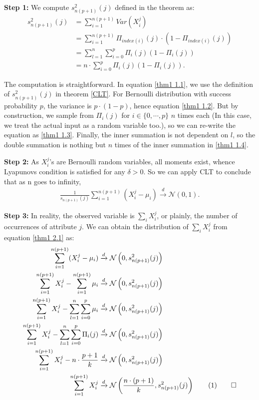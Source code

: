 \documentclass[10pt]{book}
\newcommand\numberthis{\addtocounter{equation}{1}\tag{\theequation}}
\begin{document}
\textbf{Step 1:} We compute $s_{n(p+1)}^2(j)$ defined in the theorem as:
\begin{align}
	s_{n(p+1)}^2(j) & = \sum_{i=1}^{n(p+1)} Var(X_i^j) \label{thm1 1.1} \\
		 		 	& = \sum_{i=1}^{n(p+1)} \Pi_{index(i)}(j) \cdot (1 - \Pi_{index(i)}(j)) \label{thm1 1.2} \\
		  		 	& = \sum_{l = 1}^{n} \sum_{i = 0}^{p} \Pi_i(j) (1 - \Pi_i(j))  \label{thm1 1.3}\\
		  		 	& = n \cdot \sum_{i = 0}^{p} \Pi_i(j) (1 - \Pi_i(j)) \label{thm1 1.4}.
\end{align}


The computation is straightforward. In equation \ref{thm1 1.1}, we use the definition of $s_{n(p+1)}^2(j)$ in theorem \ref{CLT}. For Bernoulli distribution with success probability $p$, the variance is $p \cdot (1 - p)$, hence equation \ref{thm1 1.2}. But by construction, we sample from $\Pi_i(j)$ for $i \in \{0, \cdots, p\}$ $n$ times each (In this case, we treat the actual input as a random variable too.), so we can re-write the equation as \ref{thm1 1.3}. Finally, the inner summation is not dependent on $l$, so the double summation is nothing but $n$ times of the inner summation in \ref{thm1 1.4}.


\textbf{Step 2:} As $X_i^j$'s are Bernoulli random variables, all moments exist, whence Lyapunovs condition is satisfied for any $\delta > 0$. So we can apply CLT to conclude that as n goes to infinity,
\begin{align}
	\frac{1}{s_{n(p+1)}(j)} \sum_{i=1}^{n(p+1)} (X_i^j - \mu_i) \xrightarrow[]{d} \mathcal{N}(0, 1). \label{thm1 2.1}
\end{align}


\textbf{Step 3:} In reality, the observed variable is $\sum_{i} X_i^j$, or plainly, the number of occurrences of attribute $j$. We can obtain the distribution of $\sum_{i} X_i^j$ from equation \ref{thm1 2.1} as:
\begin{align*}
	\sum_{i=1}^{n(p+1)} (X_i^j - \mu_i) & \xrightarrow[]{d} \mathcal{N}\left(0, s_{n(p+1)}^2(j)\right) \\
	\sum_{i=1}^{n(p+1)} X_i^j - \sum_{i=1}^{n(p+1)} \mu_i & \xrightarrow[]{d} \mathcal{N}\left(0, s_{n(p+1)}^2(j)\right) \\
	\sum_{i=1}^{n(p+1)} X_i^j - \sum_{l = 1}^{n} \sum_{i=0}^{p} \mu_i & \xrightarrow[]{d} \mathcal{N}\left(0, s_{n(p+1)}^2(j)\right) \\
	\sum_{i=1}^{n(p+1)} X_i^j - \sum_{l = 1}^{n} \sum_{i=0}^{p} \Pi_i(j) & \xrightarrow[]{d} \mathcal{N}\left(0, s_{n(p+1)}^2(j)\right) \\
	\sum_{i=1}^{n(p+1)} X_i^j - n \cdot \frac{p+1}{k} & \xrightarrow[]{d} \mathcal{N}\left(0, s_{n(p+1)}^2(j)\right) \\
	\sum_{i=1}^{n(p+1)} X_i^j & \xrightarrow[]{d} \mathcal{N}\left(\frac{n \cdot (p+1)}{k}, s_{n(p+1)}^2(j)\right) \numberthis \label{thm1 3.1} \qquad \square
\end{align*}
\end{document}
